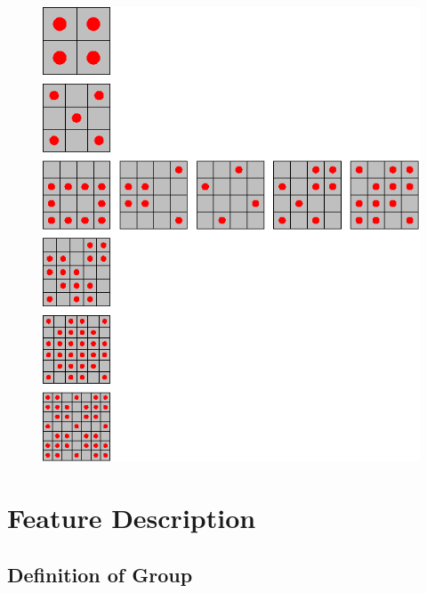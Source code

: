 \documentclass[
  manuscript=article,  %
  layout=preprint,  %
  year=20xx,
  volume=x,
]{extra/joas}
\begin{document}
\begin{figure}[ht!]
\begin{minipage}{0.25\textwidth}
    \includegraphics[width=\linewidth]{./flip game/3.eps}
  \end{minipage}
\end{figure}





% 

\newpage
\section{Feature Description}

\subsection{Definition of Group}
\end{document}
